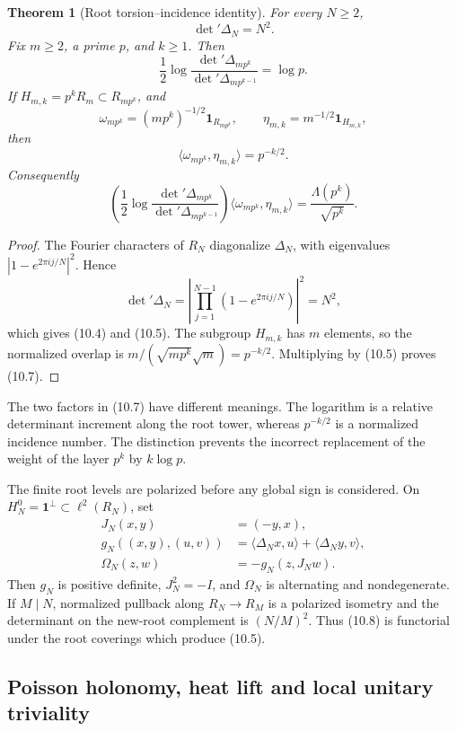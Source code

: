 \documentclass[11pt]{amsart}
\newtheorem{theorem}{Theorem}[section]
\theoremstyle{definition}
\theoremstyle{remark}
\begin{document}
\begin{theorem}[Root torsion--incidence identity]
\label{thm:root-torsion}
For every \(N\ge2\),
\[
 \det'\Delta_N=N^2.
 \tag{10.4}
\]
Fix \(m\ge2\), a prime \(p\), and \(k\ge1\).  Then
\[
 \frac12\log
 \frac{\det'\Delta_{mp^k}}{\det'\Delta_{mp^{k-1}}}
 =\log p.
 \tag{10.5}
\]
If \(H_{m,k}=p^kR_m\subset R_{mp^k}\), and
\[
 \omega_{mp^k}=(mp^k)^{-1/2}\mathbf1_{R_{mp^k}},
 \qquad
 \eta_{m,k}=m^{-1/2}\mathbf1_{H_{m,k}},
\]
then
\[
 \langle\omega_{mp^k},\eta_{m,k}\rangle=p^{-k/2}.
 \tag{10.6}
\]
Consequently
\[
 \boxed{
 \left(\frac12\log
 \frac{\det'\Delta_{mp^k}}{\det'\Delta_{mp^{k-1}}}\right)
 \langle\omega_{mp^k},\eta_{m,k}\rangle
 =\frac{\Lambda(p^k)}{\sqrt{p^k}}.}
 \tag{10.7}
\]
\end{theorem}

\begin{proof}
The Fourier characters of \(R_N\) diagonalize \(\Delta_N\), with
eigenvalues \(|1-e^{2\pi ij/N}|^2\).  Hence
\[
 \det'\Delta_N
 =\left|\prod_{j=1}^{N-1}(1-e^{2\pi ij/N})\right|^2=N^2,
\]
which gives (10.4) and (10.5).  The subgroup \(H_{m,k}\) has \(m\)
elements, so the normalized overlap is
\(m/(\sqrt{mp^k}\sqrt m)=p^{-k/2}\).  Multiplying by (10.5)
proves (10.7).
\end{proof}

The two factors in (10.7) have different meanings.  The logarithm is a
relative determinant increment along the root tower, whereas
\(p^{-k/2}\) is a normalized incidence number.  The distinction prevents
the incorrect replacement of the weight of the layer \(p^k\) by
\(k\log p\).

The finite root levels are polarized before any global sign is considered.
On \(H_N^0=\mathbf1^\perp\subset\ell^2(R_N)\), set
\[
 \begin{aligned}
 J_N(x,y)&=(-y,x),\\
 g_N((x,y),(u,v))
 &=\langle\Delta_Nx,u\rangle+\langle\Delta_Ny,v\rangle,\\
 \Omega_N(z,w)&=-g_N(z,J_Nw).
 \end{aligned}
 \tag{10.8}
\]
Then \(g_N\) is positive definite, \(J_N^2=-I\), and \(\Omega_N\) is
alternating and nondegenerate.  If \(M\mid N\), normalized pullback along
\(R_N\to R_M\) is a polarized isometry and the determinant on the new-root
complement is \((N/M)^2\).  Thus (10.8) is functorial under the root
coverings which produce (10.5).

\subsection{Poisson holonomy, heat lift and local unitary triviality}
\end{document}
